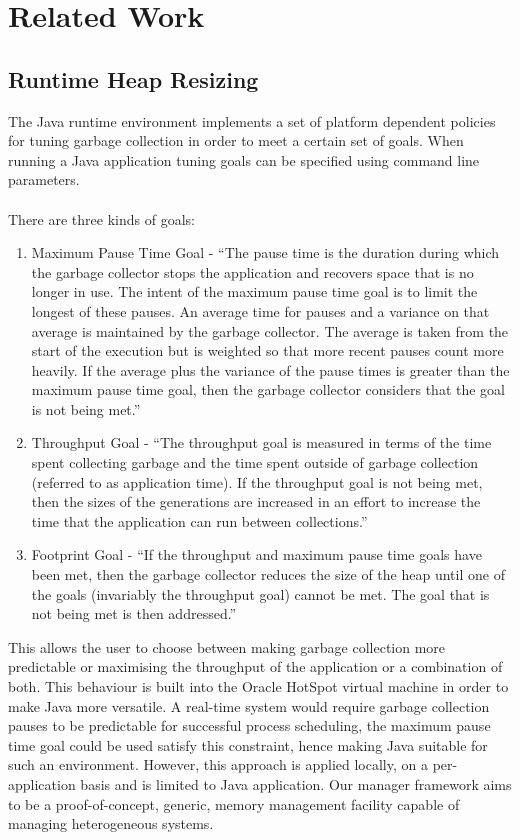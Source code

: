 \documentclass{l4proj}
\begin{document}
\section{Related Work}
\subsection{Runtime Heap Resizing}
\hspace*{1em} The Java runtime environment implements a set of platform dependent policies for tuning garbage collection in order to meet a certain set of goals. When running a Java application tuning goals can be specified using command line parameters. 
\\\\
There are three kinds of goals:
\begin{enumerate}
\item Maximum Pause Time Goal - ``The pause time is the duration during which the garbage collector stops the application and recovers space that is no longer in use. The intent of the maximum pause time goal is to limit the longest of these pauses. An average time for pauses and a variance on that average is maintained by the garbage collector. The average is taken from the start of the execution but is weighted so that more recent pauses count more heavily. If the average plus the variance of the pause times is greater than the maximum pause time goal, then the garbage collector considers that the goal is not being met.''\cite{ergonomics}
\item Throughput Goal - ``The throughput goal is measured in terms of the time spent collecting garbage and the time spent outside of garbage collection (referred to as application time). If the throughput goal is not being met, then the sizes of the generations are increased in an effort to increase the time that the application can run between collections.''\cite{ergonomics}
\item Footprint Goal - ``If the throughput and maximum pause time goals have been met, then the garbage collector reduces the size of the heap until one of the goals (invariably the throughput goal) cannot be met. The goal that is not being met is then addressed.''\cite{ergonomics}
\end{enumerate}
This allows the user to choose between making garbage collection more predictable or maximising the throughput of the application or a combination of both. This behaviour is built into the Oracle HotSpot virtual machine in order to make Java more versatile. A real-time system would require garbage collection pauses to be predictable for successful process scheduling, the maximum pause time goal could be used satisfy this constraint, hence making Java suitable for such an environment. However, this approach is applied locally, on a per-application basis and is limited to Java application. Our manager framework aims to be a proof-of-concept, generic, memory management facility capable of managing heterogeneous systems. 
\end{document}
